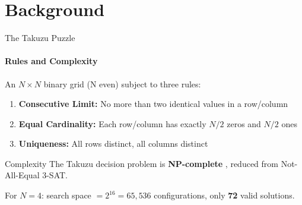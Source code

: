 \documentclass[aspectratio=169, t]{beamer}
\begin{document}
\section{Background}

\begin{frame}{The Takuzu Puzzle}
\framesubtitle{Rules and Complexity}

An $N \times N$ binary grid (N even) subject to three rules:

\bigskip
\begin{enumerate}
    \item \textbf{Consecutive Limit:} No more than two identical values in a row/column
    \item \textbf{Equal Cardinality:} Each row/column has exactly $N/2$ zeros and $N/2$ ones
    \item \textbf{Uniqueness:} All rows distinct, all columns distinct
\end{enumerate}

\bigskip
\begin{alertblock}{Complexity}
The Takuzu decision problem is \textbf{NP-complete} \cite{takuzunp2016}, reduced from Not-All-Equal 3-SAT.
\end{alertblock}

\bigskip
For $N=4$: search space $= 2^{16} = 65{,}536$ configurations, only \textbf{72} valid solutions.
\end{frame}
\end{document}
